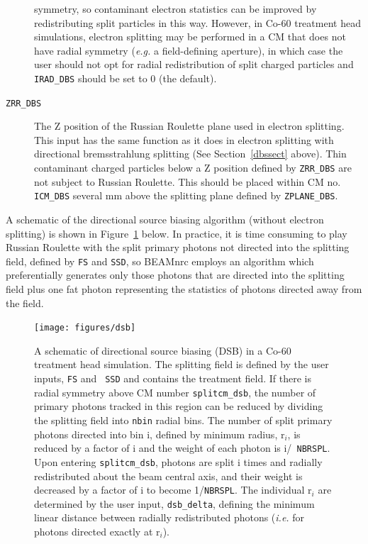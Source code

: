 \documentclass[12pt,twoside]{article}
\begin{document}
\begin{description}
symmetry, so contaminant electron statistics can be improved by redistributing split particles in this way.  However, in Co-60 treatment head simulations,
electron splitting may be performed in a CM that does not have radial symmetry ({\em e.g.} a field-defining aperture),
in which case the user should not opt for radial redistribution of split charged particles and {\tt IRAD\_DBS}
should be set to 0 (the default).
\item [{\tt ZRR\_DBS}] The Z position of the Russian Roulette plane
used in electron splitting.  This input has the same function as it does in electron splitting with
directional bremsstrahlung splitting
(See Section~\ref{dbssect} above).  Thin contaminant charged particles below a Z position defined by {\tt ZRR\_DBS}
are not subject to Russian Roulette.  This should be placed within CM no. {\tt ICM\_DBS} several mm above the splitting plane defined by {\tt ZPLANE\_DBS}.
\end{description}

A schematic of the directional source biasing algorithm (without electron splitting) is shown in Figure~\ref{dsb_fig}
below.  In practice, it is time consuming to play Russian Roulette with the split primary photons not directed into
the splitting field, defined by {\tt FS} and {\tt SSD}, so BEAMnrc employs an algorithm which preferentially
generates only those photons that are directed into the splitting field plus one fat photon representing the
statistics of photons directed away from the field.

\begin{figure}[ht]
\begin{center}
\texttt{[image: figures/dsb]}
\end{center}
\caption[Schematic of DSB]
{A schematic of directional source biasing (DSB) in a Co-60 treatment head
simulation. The splitting field is defined by the user inputs, {\tt FS} and {\tt
SSD} and contains the treatment field.  If there is radial symmetry above CM
number {\tt splitcm\_dsb}, the number of primary photons tracked in this region
can be reduced by dividing the splitting field into {\tt nbin} radial bins. The
number of split primary photons directed into bin i, defined by minimum radius,
r$_i$, is reduced by a factor of i and the weight of each photon is i/{\tt
NBRSPL}.  Upon entering {\tt splitcm\_dsb}, photons are split i times and
radially redistributed about the beam central axis, and their weight is
decreased by a factor of i to become 1/{\tt NBRSPL}. The individual r$_i$ are
determined by the user input, {\tt dsb\_delta}, defining the minimum linear
distance between radially redistributed photons ({\em i.e.} for photons directed
exactly at r$_i$).}
\label{dsb_fig}
\end{figure}
\end{document}
